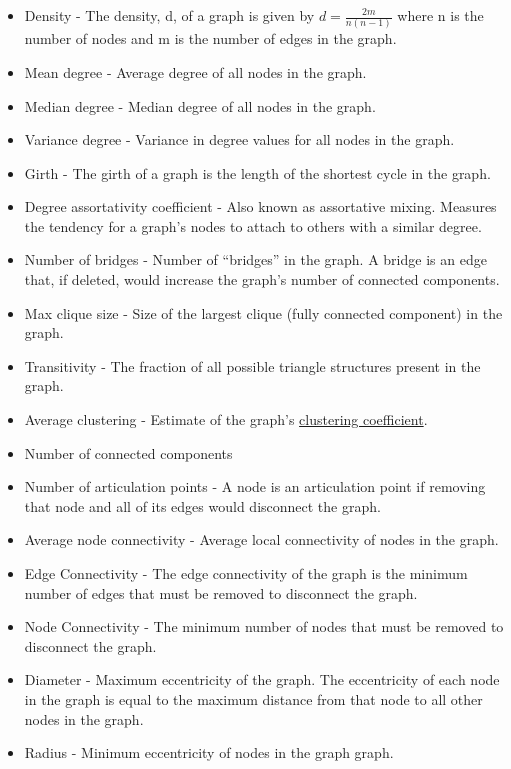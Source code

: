 \documentclass[
]{book}
\providecommand{\tightlist}{%
  \setlength{\itemsep}{0pt}\setlength{\parskip}{0pt}}
\begin{document}
\begin{itemize}
\tightlist
\item
  Density - The density, d, of a graph is given by \(d = \frac{2m}{n(n-1)}\) where n is the number of nodes and m is the number of edges in the graph.
\item
  Mean degree - Average degree of all nodes in the graph.
\item
  Median degree - Median degree of all nodes in the graph.
\item
  Variance degree - Variance in degree values for all nodes in the graph.
\item
  Girth - The girth of a graph is the length of the shortest cycle in the graph.
\item
  Degree assortativity coefficient - Also known as assortative mixing. Measures the tendency for a graph's nodes to attach to others with a similar degree.
\item
  Number of bridges - Number of ``bridges'' in the graph. A bridge is an edge that, if deleted, would increase the graph's number of connected components.
\item
  Max clique size - Size of the largest clique (fully connected component) in the graph.
\item
  Transitivity - The fraction of all possible triangle structures present in the graph.
\item
  Average clustering - Estimate of the graph's \href{https://en.wikipedia.org/wiki/Clustering_coefficient}{clustering coefficient}.
\item
  Number of connected components
\item
  Number of articulation points - A node is an articulation point if removing that node and all of its edges would disconnect the graph.
\item
  Average node connectivity - Average local connectivity of nodes in the graph.
\item
  Edge Connectivity - The edge connectivity of the graph is the minimum number of edges that must be removed to disconnect the graph.
\item
  Node Connectivity - The minimum number of nodes that must be removed to disconnect the graph.
\item
  Diameter - Maximum eccentricity of the graph. The eccentricity of each node in the graph is equal to the maximum distance from that node to all other nodes in the graph.
\item
  Radius - Minimum eccentricity of nodes in the graph graph.

\end{itemize}
\end{document}
